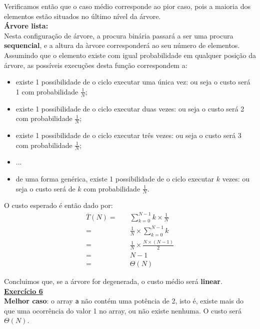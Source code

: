 \documentclass[a4paper,11pt]{article}
\begin{document}
	\noindent Verificamos então que o caso médio corresponde ao pior caso, pois a maioria dos elementos estão situados no último nível da árvore.\\
	
	\noindent \textbf{Árvore lista:}\\
	
	\noindent Nesta configuração de árvore, a procura binária passará a ser uma procura \textbf{sequencial}, e a altura da àrvore corresponderá ao seu número de elementos. Assumindo que o elemento existe com igual probabilidade em qualquer posição da árvore, as possíveis execuções desta função correspondem a:
	
	\begin{itemize}
		\item existe 1 possibilidade de o ciclo executar uma única vez: ou seja o custo será 1 com probabilidade $\frac{1}{N}$;
		\item existe 1 possibilidade de o ciclo executar duas vezes: ou seja o custo será 2 com probabilidade $\frac{1}{N}$;
		\item existe 1 possibilidade de o ciclo executar três vezes: ou seja o custo será 3 com probabilidade $\frac{1}{N}$;
		\item ...
		\item de uma forma genérica, existe 1 possibilidade de o ciclo executar $k$ vezes: ou seja o custo será de $k$ com probabilidade $\frac{1}{N}$.
	\end{itemize}
	
	\noindent O custo esperado é então dado por:
	\begin{align*}
		\overline{T}(N) = \quad &\sum_{k=0}^{N-1} k \times \frac{1}{N}\\
		= \quad &\frac{1}{N} \times \sum_{k=0}^{N-1} k\\
		= \quad &\frac{1}{N} \times \frac{N \times (N-1)}{2}\\
		= \quad &N-1\\
		= \quad &\Theta(N)
	\end{align*}
	
	\noindent Concluimos que, se a árvore for degenerada, o custo médio será \textbf{linear}.\\
	
	
	\noindent \underline{\textbf{Exercício 6}}\\
	
	\noindent \textbf{Melhor caso}: o array \texttt{a} não contém uma potência de 2, isto é, existe mais do que uma ocorrência do valor 1 no array, ou não existe nenhuma. O custo será $\Theta(N)$.\\
	
\end{document}
